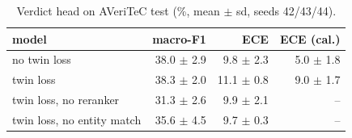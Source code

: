 \begin{table}[t]
\centering
\caption{Verdict head on AVeriTeC test (\%, mean $\pm$ sd, seeds 42/43/44).}
\label{tab:tab_averitec}
\begin{tabular}{lrrr}
\toprule
model & macro-F1 & ECE & ECE (cal.) \\
\midrule
no twin loss & 38.0 $\pm$ 2.9 & 9.8 $\pm$ 2.3 & 5.0 $\pm$ 1.8 \\
twin loss & 38.3 $\pm$ 2.0 & 11.1 $\pm$ 0.8 & 9.0 $\pm$ 1.7 \\
twin loss, no reranker & 31.3 $\pm$ 2.6 & 9.9 $\pm$ 2.1 & – \\
twin loss, no entity match & 35.6 $\pm$ 4.5 & 9.7 $\pm$ 0.3 & – \\
\bottomrule
\end{tabular}
\end{table}
